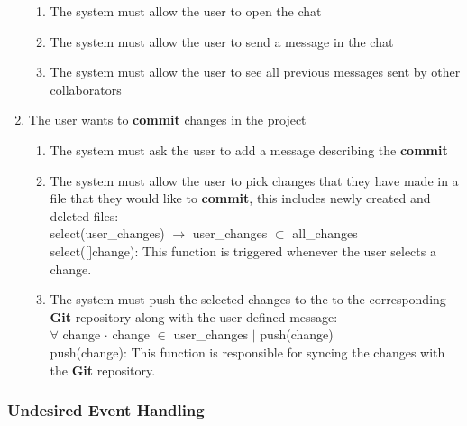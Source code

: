 \documentclass[12pt, titlepage]{article}
\begin{document}
\begin{enumerate}[{BE}1.]
		\begin{enumerate}[resume*]
			\item The system must allow the user to open the chat
			\item The system must allow the user to send a message in the chat
			\item The system must allow the user to see all previous messages sent by other collaborators
		\end{enumerate}
		\item The user wants to \textbf{commit} changes in the project
		\begin{enumerate}[resume*]
			\item The system must ask the user to add a message describing the \textbf{commit}
			\item The system must allow the user to pick changes that they have made in a file that they would like to \textbf{commit}, this includes newly created and deleted files:\\
			
			select(user\_changes) $\rightarrow$ user\_changes $\subset$ all\_changes\\
			
			select([]change): This function is triggered whenever the user selects a change.\\
			
			\item The system must push the selected changes to the to the corresponding \textbf{Git} repository along with the user defined message:\\
			
			$\forall$ change $\cdot$ change $\in$ user\_changes $\vert$ push(change)\\
			
			push(change): This function is responsible for syncing the changes with the \textbf{Git} repository.\\
			
		\end{enumerate}
	\end{enumerate}
	
	\subsubsection{Undesired Event Handling}
	
\end{document}
